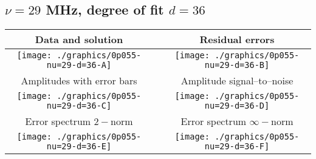 

% 

\clearpage{}
\break{}

\subsection{$\nu = 29$ MHz, degree of fit $d = 36$}

\begin{table}[h]
    \begin{center}
        \begin{tabular}{ccc}
            Data and solution & \quad & Residual errors \\\hline
            \texttt{[image: ./graphics/0p055-nu=29-d=36-A]} &&
            \texttt{[image: ./graphics/0p055-nu=29-d=36-B]} \\[15pt]
            Amplitudes with error bars && Amplitude signal--to--noise \\\hline
            \texttt{[image: ./graphics/0p055-nu=29-d=36-C]} &&
            \texttt{[image: ./graphics/0p055-nu=29-d=36-D]} \\[15pt]
            Error spectrum $2-$norm && Error spectrum $\infty-$norm \\\hline
            \texttt{[image: ./graphics/0p055-nu=29-d=36-E]} &&
            \texttt{[image: ./graphics/0p055-nu=29-d=36-F]} \\[15pt]
        \end{tabular}
    \end{center}
\label{fig:elev=55, nu=29}
\end{table}



\endinput
